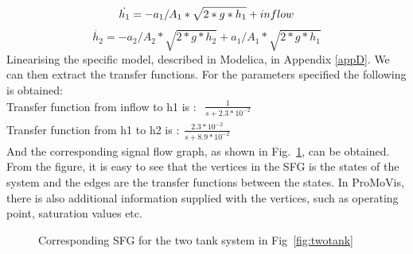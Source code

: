 \begin{equation}
    \dot{h_1} = -a_1/A_1*\sqrt{2*g*h_1} + inflow\\\newline
\end{equation}
\begin{equation}
	\dot{h_2} = -a_2/A_2*\sqrt{2*g*h_2} + a_1/A_1*\sqrt{2*g*h_1}
\end{equation}
Linearising the specific model, described in Modelica,  in Appendix \ref{appD}. We can then extract the transfer functions. For the parameters specified the following is obtained:\\\newline
Transfer function from inflow to h1 is : $\begin{array}{rcl} \frac{1}{s +2.3*10^{-2}} \end{array}$\\\newline
Transfer function from h1 to h2 is :$\begin{array}{rcl} \frac{2.3*10^{-2}}{s +8.9*10^{-2}} \end{array}$\\\newline
And the corresponding signal flow graph, as shown in Fig.~\ref{fig:sfg}, can be obtained. From the figure, it is easy to see that the vertices in the SFG is the states of the system and the edges are the transfer functions between the states. In ProMoVis, there is also additional information supplied with the vertices, such as operating point, saturation values etc. 
\begin{figure}
\caption{Corresponding SFG for the two tank system in Fig~\ref{fig:twotank}}
\label{fig:sfg}
\end{figure}
